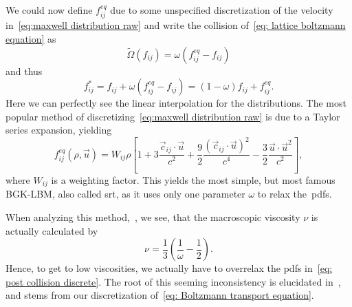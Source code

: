 We could now define $f_{ij}^{eq}$ due to some unspecified discretization of the velocity in~\eqref{eq:maxwell distribution raw} and write the collision of~\eqref{eq: lattice boltzmann equation} as
\begin{equation}
  \tilde{\Omega}(f_{ij}) = \omega \left(f_{ij}^{eq} - f_{ij}\right)
\end{equation}
and thus
\begin{equation}
  \label{eq: post collision discrete}
  f_{ij}^* = f_{ij} + \omega \left(f_{ij}^{eq} - f_{ij}\right) = (1-\omega)f_{ij} + f_{ij}^{eq}.
\end{equation}
Here we can perfectly see the linear interpolation for the distributions.
The most popular method of discretizing~\eqref{eq:maxwell distribution raw} is due to a Taylor series expansion, yielding
\begin{equation}
  f_{ij}^{eq}(\rho,\vec{u}) = W_{ij}\rho
  \left[
    1
    + 3\frac{\vec{c}_{ij} \cdot \vec{u}}{c^2}
    + \frac{9}{2}\frac{{(\vec{c}_{ij} \cdot \vec{u})}^2}{c^4}
    - \frac{3}{2}\frac{\vec{u} \cdot \vec{u}^2}{c^2}
  \right],
\end{equation}
where $W_{ij}$ is a weighting factor.
This yields the most simple, but most famous BGK-LBM, also called \gls{srt}, as it uses only one parameter $\omega$ to relax the~\glspl{pdf}.

When analyzing this method,~\cite[Section 5.2.3]{wolf2000lattice}, we see, that the macroscopic viscosity $\nu$ is actually calculated by
\begin{equation}
  \nu = \frac{1}{3}\left(\frac{1}{\omega} - \frac{1}{2}\right).
\end{equation}
Hence, to get to low viscosities, we actually have to overrelax the \glspl{pdf} in~\eqref{eq: post collision discrete}.
The root of this seeming inconsistency is elucidated in~\cite[Section 4]{karlin2006elements}, and stems from our discretization of~\eqref{eq: Boltzmann transport equation}.


